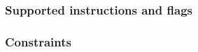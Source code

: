 
\subsubsection{Supported instructions and flags}    \label{hub: instruction handling: storage: flags}               
\subsubsection{Constraints}                         \label{hub: instruction handling: storage: constraints}         
